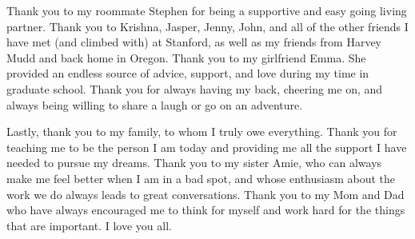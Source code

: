 Thank you to my roommate Stephen for being a supportive and easy going living partner. Thank you to Krishna, Jasper, Jenny, John, and all of the other friends I have met (and climbed with) at Stanford, as well as my friends from Harvey Mudd and back home in Oregon. Thank you to my girlfriend Emma. She provided an endless source of advice, support, and love during my time in graduate school. Thank you for always having my back, cheering me on, and always being willing to share a laugh or go on an adventure. 

Lastly, thank you to my family, to whom I truly owe everything. Thank you for teaching me to be the person I am today and providing me all the support I have needed to pursue my dreams. Thank you to my sister Amie, who can always make me feel better when I am in a bad spot, and whose enthusiasm about the work we do always leads to great conversations. Thank you to my Mom and Dad who have always encouraged me to think for myself and work hard for the things that are important. I love you all.
